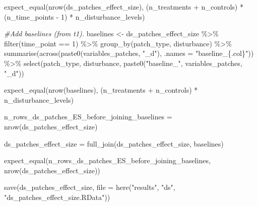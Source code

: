 \documentclass[
]{article}
\newenvironment{Shaded}{\begin{snugshade}}{\end{snugshade}}
\newcommand{\AttributeTok}[1]{\textcolor[rgb]{0.77,0.63,0.00}{#1}}
\newcommand{\CommentTok}[1]{\textcolor[rgb]{0.56,0.35,0.01}{\textit{#1}}}
\newcommand{\DecValTok}[1]{\textcolor[rgb]{0.00,0.00,0.81}{#1}}
\newcommand{\FunctionTok}[1]{\textcolor[rgb]{0.00,0.00,0.00}{#1}}
\newcommand{\NormalTok}[1]{#1}
\newcommand{\OtherTok}[1]{\textcolor[rgb]{0.56,0.35,0.01}{#1}}
\newcommand{\SpecialCharTok}[1]{\textcolor[rgb]{0.00,0.00,0.00}{#1}}
\newcommand{\StringTok}[1]{\textcolor[rgb]{0.31,0.60,0.02}{#1}}
\begin{document}
\begin{Shaded}
\begin{Highlighting}[]
\FunctionTok{expect\_equal}\NormalTok{(}\FunctionTok{nrow}\NormalTok{(ds\_patches\_effect\_size), }
\NormalTok{             (n\_treatments }\SpecialCharTok{+}\NormalTok{ n\_controls) }\SpecialCharTok{*}\NormalTok{ (n\_time\_points }\SpecialCharTok{{-}} \DecValTok{1}\NormalTok{) }\SpecialCharTok{*}\NormalTok{ n\_disturbance\_levels)}
\end{Highlighting}
\end{Shaded}

\begin{Shaded}
\begin{Highlighting}[]
\CommentTok{\#Add baselines (from t1).}
\NormalTok{baselines }\OtherTok{\textless{}{-}}\NormalTok{ ds\_patches\_effect\_size }\SpecialCharTok{\%\textgreater{}\%}
  \FunctionTok{filter}\NormalTok{(time\_point }\SpecialCharTok{==} \DecValTok{1}\NormalTok{) }\SpecialCharTok{\%\textgreater{}\%}
  \FunctionTok{group\_by}\NormalTok{(patch\_type, disturbance) }\SpecialCharTok{\%\textgreater{}\%}
  \FunctionTok{summarise}\NormalTok{(}\FunctionTok{across}\NormalTok{(}\FunctionTok{paste0}\NormalTok{(variables\_patches, }\StringTok{"\_d"}\NormalTok{), }
                   \AttributeTok{.names =} \StringTok{"baseline\_\{.col\}"}\NormalTok{)) }\SpecialCharTok{\%\textgreater{}\%}
  \FunctionTok{select}\NormalTok{(patch\_type,}
\NormalTok{         disturbance,}
         \FunctionTok{paste0}\NormalTok{(}\StringTok{"baseline\_"}\NormalTok{, variables\_patches, }\StringTok{"\_d"}\NormalTok{))}


\FunctionTok{expect\_equal}\NormalTok{(}\FunctionTok{nrow}\NormalTok{(baselines), }
\NormalTok{             (n\_treatments }\SpecialCharTok{+}\NormalTok{ n\_controls) }\SpecialCharTok{*}\NormalTok{ n\_disturbance\_levels)}

\NormalTok{n\_rows\_ds\_patches\_ES\_before\_joining\_baselines }\OtherTok{=} \FunctionTok{nrow}\NormalTok{(ds\_patches\_effect\_size)}

\NormalTok{ds\_patches\_effect\_size }\OtherTok{=} \FunctionTok{full\_join}\NormalTok{(ds\_patches\_effect\_size, baselines)}

\FunctionTok{expect\_equal}\NormalTok{(n\_rows\_ds\_patches\_ES\_before\_joining\_baselines, }
               \FunctionTok{nrow}\NormalTok{(ds\_patches\_effect\_size))}
\end{Highlighting}
\end{Shaded}

\begin{Shaded}
\begin{Highlighting}[]
\FunctionTok{save}\NormalTok{(ds\_patches\_effect\_size, }\AttributeTok{file =} \FunctionTok{here}\NormalTok{(}\StringTok{"results"}\NormalTok{, }\StringTok{"ds"}\NormalTok{, }\StringTok{"ds\_patches\_effect\_size.RData"}\NormalTok{))}
\end{Highlighting}
\end{Shaded}
\end{document}
